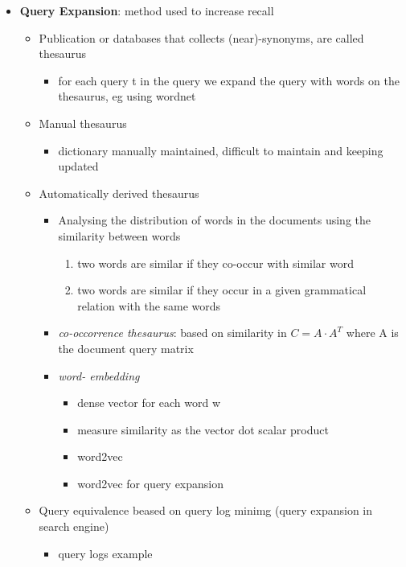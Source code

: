 \begin{itemize}
    \item \textbf{Query Expansion}: method used to increase recall
    \begin{itemize}
        \item Publication or databases that collects (near)-synonyms, are called thesaurus
        \begin{itemize}
            \item for each query t in the query we expand the query with words on the thesaurus, eg using wordnet
        \end{itemize}
        \item Manual thesaurus
        \begin{itemize}
            \item dictionary manually maintained, difficult to maintain and keeping updated
        \end{itemize}
        \item Automatically derived thesaurus
        \begin{itemize}
            \item Analysing the distribution of words in the documents using the similarity between words
            \begin{enumerate}
                \item two words are similar if they co-occur with similar word
                \item two words are similar if they occur in a given grammatical relation with the same words
            \end{enumerate}
            \item \textit{co-occorrence thesaurus}: based on similarity in \(C=A \cdot A^T\) where A is the document query matrix
            \item \textit{word- embedding}
            \begin{itemize}
                \item dense vector for each word w
                \item measure similarity as the vector dot scalar product
                \item word2vec
                \item word2vec for query expansion
            \end{itemize}
        \end{itemize}
        \item Query equivalence beased on query log minimg (query expansion in search engine)
        \begin{itemize}
            \item query logs example
        \end{itemize}
    \end{itemize}
\end{itemize}

